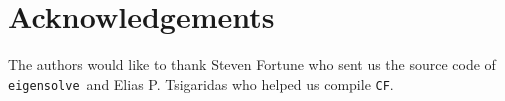\documentclass[10pt,a4paper]{article}
\def \cf {{\tt CF}}
\def \eign {{\tt eigensolve}}
\begin{document}



%
%


\section*{Acknowledgements}
The authors would like to thank Steven Fortune who sent us the source code of \eign\ and Elias P. Tsigaridas who helped us compile \cf.







\end{document}
